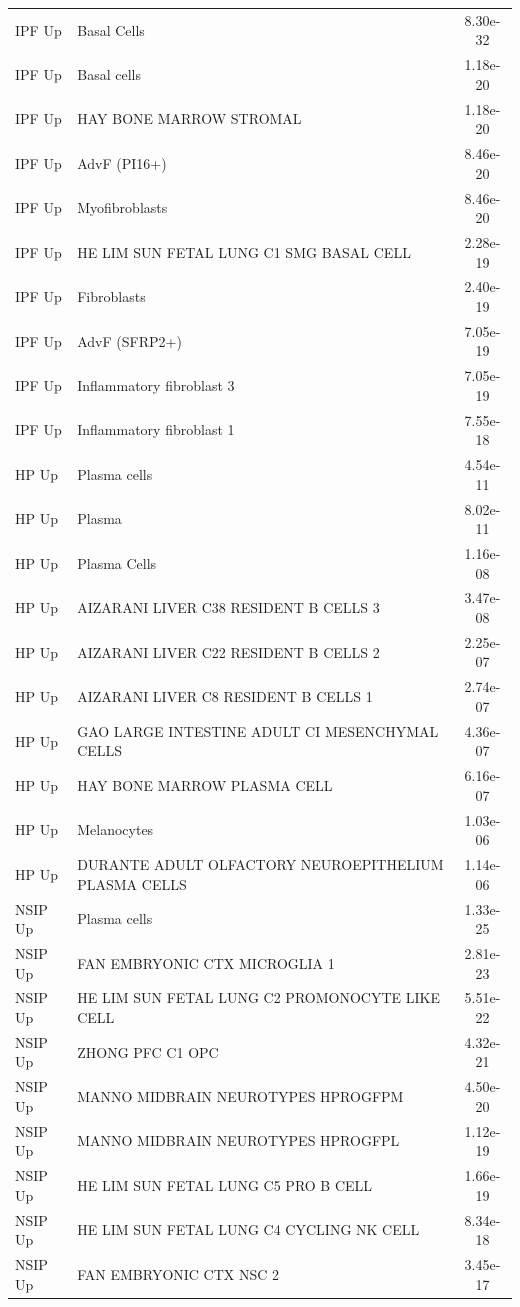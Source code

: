 \documentclass[
]{article}
\begin{document}
\begin{singlespace}
\begin{longtable}[t]{>{\raggedright\arraybackslash}p{0.8in}>{\raggedright\arraybackslash}p{4.5in}c}
\endfoot
\bottomrule
\endlastfoot
IPF Up & Basal Cells & 8.30e-32\\
IPF Up & Basal cells & 1.18e-20\\
IPF Up & HAY BONE MARROW STROMAL & 1.18e-20\\
IPF Up & AdvF (PI16+) & 8.46e-20\\
IPF Up & Myofibroblasts & 8.46e-20\\
\addlinespace
IPF Up & HE LIM SUN FETAL LUNG C1 SMG BASAL CELL & 2.28e-19\\
IPF Up & Fibroblasts & 2.40e-19\\
IPF Up & AdvF (SFRP2+) & 7.05e-19\\
IPF Up & Inflammatory fibroblast 3 & 7.05e-19\\
IPF Up & Inflammatory fibroblast 1 & 7.55e-18\\
\addlinespace
HP Up & Plasma cells & 4.54e-11\\
HP Up & Plasma & 8.02e-11\\
HP Up & Plasma Cells & 1.16e-08\\
HP Up & AIZARANI LIVER C38 RESIDENT B CELLS 3 & 3.47e-08\\
HP Up & AIZARANI LIVER C22 RESIDENT B CELLS 2 & 2.25e-07\\
\addlinespace
HP Up & AIZARANI LIVER C8 RESIDENT B CELLS 1 & 2.74e-07\\
HP Up & GAO LARGE INTESTINE ADULT CI MESENCHYMAL CELLS & 4.36e-07\\
HP Up & HAY BONE MARROW PLASMA CELL & 6.16e-07\\
HP Up & Melanocytes & 1.03e-06\\
HP Up & DURANTE ADULT OLFACTORY NEUROEPITHELIUM PLASMA CELLS & 1.14e-06\\
\addlinespace
NSIP Up & Plasma cells & 1.33e-25\\
NSIP Up & FAN EMBRYONIC CTX MICROGLIA 1 & 2.81e-23\\
NSIP Up & HE LIM SUN FETAL LUNG C2 PROMONOCYTE LIKE CELL & 5.51e-22\\
NSIP Up & ZHONG PFC C1 OPC & 4.32e-21\\
NSIP Up & MANNO MIDBRAIN NEUROTYPES HPROGFPM & 4.50e-20\\
\addlinespace
NSIP Up & MANNO MIDBRAIN NEUROTYPES HPROGFPL & 1.12e-19\\
NSIP Up & HE LIM SUN FETAL LUNG C5 PRO B CELL & 1.66e-19\\
NSIP Up & HE LIM SUN FETAL LUNG C4 CYCLING NK CELL & 8.34e-18\\
NSIP Up & FAN EMBRYONIC CTX NSC 2 & 3.45e-17\\

\end{longtable}
\end{singlespace}
\end{document}
